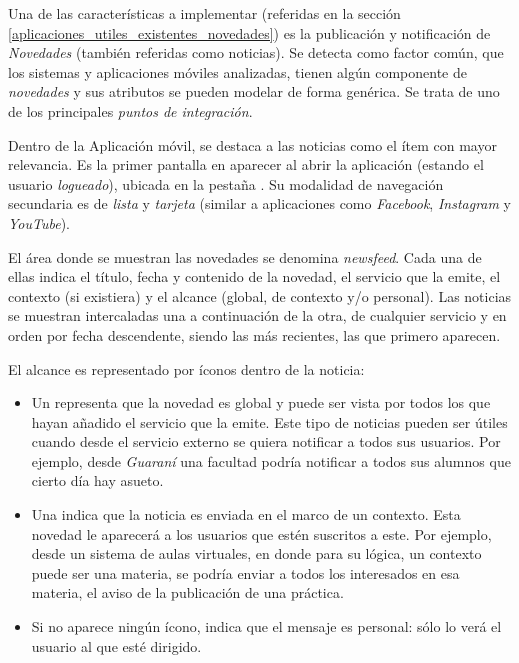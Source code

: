 Una de las características a implementar (referidas en la sección \ref{aplicaciones_utiles_existentes_novedades}) es la publicación y notificación de \textit{Novedades} (también referidas como noticias). Se detecta como factor común, que los sistemas y aplicaciones móviles analizadas, tienen algún componente de \textit{novedades} y sus atributos se pueden modelar de forma genérica. Se trata de uno de los principales \textit{puntos de integración}.

Dentro de la Aplicación móvil, se destaca a las noticias como el ítem con mayor relevancia. Es la primer pantalla en aparecer al abrir la aplicación (estando el usuario \textit{logueado}), ubicada en la pestaña .
Su modalidad de navegación secundaria es de \textit{lista} y \textit{tarjeta} (similar a aplicaciones como \textit{Facebook}, \textit{Instagram} y \textit{YouTube}). 


El área donde se muestran las novedades se denomina \textit{newsfeed}. Cada una de ellas indica el título, fecha y contenido de la novedad, el servicio que la emite, el contexto (si existiera) y el alcance (global, de contexto y/o personal). Las noticias se muestran intercaladas una a continuación de la otra, de cualquier servicio y en orden por fecha descendente, siendo las más recientes, las que primero aparecen.

El alcance es representado por íconos dentro de la noticia:
\begin{itemize}
\item Un  representa que la novedad es global y puede ser vista por todos los que hayan añadido el servicio que la emite. Este tipo de noticias pueden ser útiles cuando desde el servicio externo se quiera notificar a todos sus usuarios. Por ejemplo, desde \textit{Guaraní} una facultad podría notificar a todos sus alumnos que cierto día hay asueto.
\item Una  indica que la noticia es enviada en el marco de un contexto. Esta novedad le aparecerá a los usuarios que estén suscritos a este. Por ejemplo, desde un sistema de aulas virtuales, en donde para su lógica, un contexto puede ser una materia, se podría enviar a todos los interesados en esa materia, el aviso de la publicación de una práctica. 
\item Si no aparece ningún ícono, indica que el mensaje es personal: sólo lo verá el usuario al que esté dirigido.
\end{itemize}

